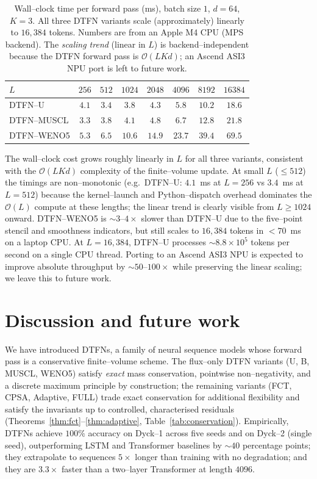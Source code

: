 \documentclass[10pt]{article}
\theoremstyle{definition}
\theoremstyle{remark}
\begin{document}
\begin{table}[h]
  \centering
  \caption{Wall--clock time per forward pass (ms), batch size $1$,
    $d = 64$, $K = 3$.  All three DTFN variants scale (approximately)
    linearly to $16{,}384$ tokens.  Numbers are from an Apple M4 CPU
    (MPS backend).  The \emph{scaling trend} (linear in $L$) is
    backend--independent because the DTFN forward pass is
    $\mathcal{O}(L K d)$; an Ascend ASI3 NPU port is left to future
    work.}
  \label{tab:npu-scaling}
  \begin{tabular}{lccccccc}
    \toprule
    $L$ & $256$ & $512$ & $1024$ & $2048$ & $4096$ & $8192$ & $16384$ \\
    \midrule
    DTFN--U     & $4.1$  & $3.4$  & $3.8$  & $4.3$  & $5.8$  & $10.2$ & $18.6$ \\
    DTFN--MUSCL & $3.3$  & $3.8$  & $4.1$  & $4.8$  & $6.7$  & $12.8$ & $21.8$ \\
    DTFN--WENO5 & $5.3$  & $6.5$  & $10.6$ & $14.9$ & $23.7$ & $39.4$ & $69.5$ \\
    \bottomrule
  \end{tabular}
\end{table}

The wall--clock cost grows roughly linearly in $L$ for all three
variants, consistent with the $\mathcal{O}(L K d)$ complexity of the
finite--volume update.  At small $L$ ($\le 512$) the timings are
non--monotonic (e.g.\ DTFN--U: $4.1$~ms at $L=256$ vs $3.4$~ms at
$L=512$) because the kernel--launch and Python--dispatch overhead
dominates the $\mathcal{O}(L)$ compute at these lengths; the linear
trend is clearly visible from $L \ge 1024$ onward.  DTFN--WENO5 is
$\sim 3$--$4\times$ slower than DTFN--U due to the five--point
stencil and smoothness indicators, but still scales to $16{,}384$
tokens in $< 70$~ms on a laptop CPU.  At $L = 16{,}384$, DTFN--U
processes $\sim 8.8 \times 10^{5}$ tokens per second on a single CPU
thread.  Porting to an Ascend ASI3 NPU is expected to improve
absolute throughput by $\sim 50$--$100\times$ while preserving the
linear scaling; we leave this to future work.


\section{Discussion and future work}
\label{sec:discussion}

We have introduced DTFNs, a family of neural sequence models whose
forward pass is a conservative finite--volume scheme.  The flux--only
DTFN variants (U, B, MUSCL, WENO5) satisfy \emph{exact} mass
conservation, pointwise non--negativity, and a discrete maximum
principle by construction; the remaining variants (FCT, CPSA,
Adaptive, FULL) trade exact conservation for additional flexibility
and satisfy the invariants up to controlled, characterised residuals
(Theorems~\ref{thm:fct}--\ref{thm:adaptive},
Table~\ref{tab:conservation}).  Empirically, DTFNs
achieve $100\%$ accuracy on Dyck--1 across five seeds and on Dyck--2
(single seed), outperforming LSTM and Transformer baselines by $\sim
40$ percentage points; they extrapolate to sequences $5\times$ longer
than training with no degradation; and they are $3.3\times$ faster
than a two--layer Transformer at length $4096$.
\end{document}
